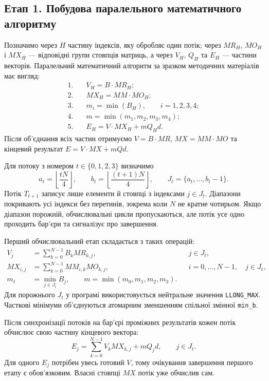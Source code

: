 \documentclass[12pt,a4paper]{article}
\begin{document}
\subsection{Етап 1. Побудова паралельного математичного алгоритму}

Позначимо через $H$ частину індексів, яку обробляє один потік; через
$MR_H$, $MO_H$ і $MX_H$ --- відповідні групи стовпців матриць, а через
$V_H$, $Q_H$ та $E_H$ --- частини векторів. Паралельний математичний
алгоритм за зразком методичних матеріалів має вигляд:
\begin{align}
1.\quad &V_H=B\cdot MR_H; \label{eq:parallel-v}\\
2.\quad &MX_H=MM\cdot MO_H; \label{eq:parallel-mx}\\
3.\quad &m_i=\min(B_H),\qquad i=1,2,3,4; \label{eq:parallel-local-min}\\
4.\quad &m=\min(m_1,m_2,m_3,m_4); \label{eq:parallel-min}\\
5.\quad &E_H=V\cdot MX_H+mQ_Hd. \label{eq:parallel-e}
\end{align}
Після об’єднання всіх частин отримуємо $V=B\cdot MR$,
$MX=MM\cdot MO$ та кінцевий результат $E=V\cdot MX+mQd$.

Для потоку з номером $t\in\{0,1,2,3\}$ визначимо
\begin{equation}
 a_t=\left\lfloor\frac{tN}{4}\right\rfloor,\qquad
 b_t=\left\lfloor\frac{(t+1)N}{4}\right\rfloor,\qquad
 J_t=\{a_t,\ldots,b_t-1\}.
 \label{eq:ranges}
\end{equation}
Потік $T_{t+1}$ записує лише елементи й стовпці з індексами $j\in J_t$.
Діапазони покривають усі індекси без перетинів, зокрема коли $N$ не
кратне чотирьом. Якщо діапазон порожній, обчислювальні цикли
пропускаються, але потік усе одно проходить бар’єри та сигналізує про
завершення.

Перший обчислювальний етап складається з таких операцій:
\begin{align}
 V_j &= \sum_{k=0}^{N-1}B_k MR_{k,j}, && j\in J_t,\\
 MX_{i,j} &= \sum_{k=0}^{N-1}MM_{i,k}MO_{k,j},
 && i=0,\ldots,N-1,\quad j\in J_t,\\
 m_t &= \min_{j\in J_t}B_j,\qquad
 m=\min(m_0,m_1,m_2,m_3).
\end{align}
Для порожнього $J_t$ у програмі використовується нейтральне значення
\texttt{LLONG\_MAX}. Часткові мінімуми об’єднуються атомарним
зменшенням спільної змінної \texttt{min\_b}.

Після синхронізації потоків на бар’єрі проміжних результатів кожен
потік обчислює свою частину кінцевого вектора:
\begin{equation}
 E_j=\sum_{k=0}^{N-1}V_k MX_{k,j}+mQ_jd,\qquad j\in J_t.
 \label{eq:result}
\end{equation}
Для одного $E_j$ потрібен увесь готовий $V$, тому очікування завершення
першого етапу є обов’язковим. Власні стовпці $MX$ потік уже обчислив сам.
\end{document}
